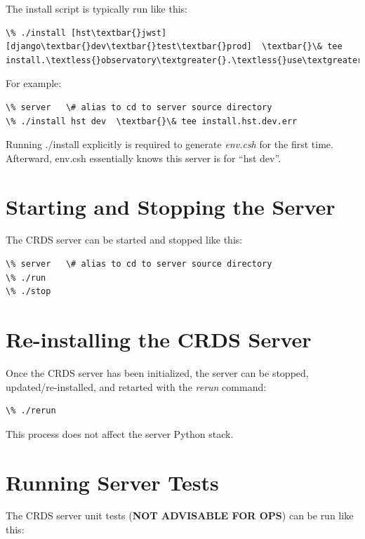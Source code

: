 \documentclass[letterpaper,10pt,english]{sphinxmanual}
\begin{document}
The install script is typically run like this:

\begin{Verbatim}[commandchars=\\\{\}]
\% ./install [hst\textbar{}jwst]  [django\textbar{}dev\textbar{}test\textbar{}prod]  \textbar{}\& tee install.\textless{}observatory\textgreater{}.\textless{}use\textgreater{}.err
\end{Verbatim}

For example:

\begin{Verbatim}[commandchars=\\\{\}]
\% server   \# alias to cd to server source directory
\% ./install hst dev  \textbar{}\& tee install.hst.dev.err
\end{Verbatim}

Running ./install explicitly is required to generate \emph{env.csh} for the first time.  Afterward,  env.csh essentially
knows this server is for ``hst dev''.


\section{Starting and Stopping the Server}
\label{server_guide:starting-and-stopping-the-server}
The CRDS server can be started and stopped like this:

\begin{Verbatim}[commandchars=\\\{\}]
\% server   \# alias to cd to server source directory
\% ./run
\% ./stop
\end{Verbatim}


\section{Re-installing the CRDS Server}
\label{server_guide:re-installing-the-crds-server}
Once the CRDS server has been initialized, the server can be stopped, updated/re-installed, and retarted with
the \emph{rerun} command:

\begin{Verbatim}[commandchars=\\\{\}]
\% ./rerun
\end{Verbatim}

This process does not affect the server Python stack.


\section{Running Server Tests}
\label{server_guide:running-server-tests}
The CRDS server unit tests (\textbf{NOT ADVISABLE FOR OPS}) can be run like this:
\end{document}
